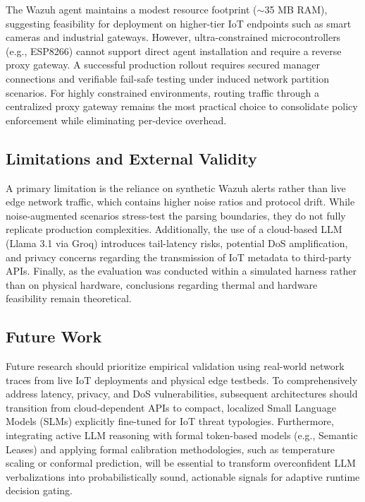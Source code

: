 \documentclass[
]{ceurart}
\begin{document}
The Wazuh agent maintains a modest resource footprint ($\sim$35 MB RAM), suggesting feasibility for deployment on higher-tier IoT endpoints such as smart cameras and industrial gateways. However, ultra-constrained microcontrollers (e.g., ESP8266) cannot support direct agent installation and require a reverse proxy gateway. A successful production rollout requires secured manager connections and verifiable fail-safe testing under induced network partition scenarios. For highly constrained environments, routing traffic through a centralized proxy gateway remains the most practical choice to consolidate policy enforcement while eliminating per-device overhead.

\subsection{Limitations and External Validity}

A primary limitation is the reliance on synthetic Wazuh alerts rather than live edge network traffic, which contains higher noise ratios and protocol drift. While noise-augmented scenarios stress-test the parsing boundaries, they do not fully replicate production complexities. Additionally, the use of a cloud-based LLM (Llama 3.1 via Groq) introduces tail-latency risks, potential DoS amplification, and privacy concerns regarding the transmission of IoT metadata to third-party APIs. Finally, as the evaluation was conducted within a simulated harness rather than on physical hardware, conclusions regarding thermal and hardware feasibility remain theoretical.

\subsection{Future Work}

Future research should prioritize empirical validation using real-world network traces from live IoT deployments and physical edge testbeds. To comprehensively address latency, privacy, and DoS vulnerabilities, subsequent architectures should transition from cloud-dependent APIs to compact, localized Small Language Models (SLMs) explicitly fine-tuned for IoT threat typologies. Furthermore, integrating active LLM reasoning with formal token-based models (e.g., Semantic Leases) and applying formal calibration methodologies, such as temperature scaling or conformal prediction, will be essential to transform overconfident LLM verbalizations into probabilistically sound, actionable signals for adaptive runtime decision gating.
\end{document}

